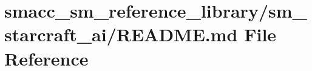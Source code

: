 \hypertarget{smacc__sm__reference__library_2sm__starcraft__ai_2README_8md}{}\section{smacc\+\_\+sm\+\_\+reference\+\_\+library/sm\+\_\+starcraft\+\_\+ai/\+R\+E\+A\+D\+ME.md File Reference}
\label{smacc__sm__reference__library_2sm__starcraft__ai_2README_8md}
